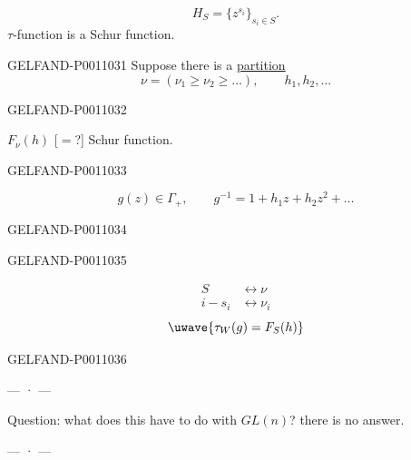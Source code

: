 \[
H_S=\{z^{s_i}\}_{s_i\in S}.
\]
$\tau$-function is a Schur function.


\begin{GelfandAdjacentEvidence}{GELFAND-P001103}{1}
Suppose there is a \underline{partition}
\[
\nu=(\nu_1\geq\nu_2\geq\ldots),\qquad h_1,h_2,\ldots
\]
\end{GelfandAdjacentEvidence}
\begin{GelfandAdjacentEvidence}{GELFAND-P001103}{2}

$F_\nu(h)$ [$=$?] Schur function.
\end{GelfandAdjacentEvidence}
\begin{GelfandAdjacentEvidence}{GELFAND-P001103}{3}


\[
g(z)\in\Gamma_+,\qquad g^{-1}=1+h_1z+h_2z^2+\ldots
\]
\end{GelfandAdjacentEvidence}
\begin{GelfandAdjacentEvidence}{GELFAND-P001103}{4}

\end{GelfandAdjacentEvidence}
\begin{GelfandAdjacentEvidence}{GELFAND-P001103}{5}

\[
\begin{aligned}
S&\leftrightarrow\nu\\
i-s_i&\leftrightarrow\nu_i
\end{aligned}
\]
\[
\text{\uwave{\(\tau_W(g)=F_S(h)\)}}
\]
\end{GelfandAdjacentEvidence}
\begin{GelfandAdjacentEvidence}{GELFAND-P001103}{6}


\begin{center}— · —\end{center}
Question: what does this have to do with $GL(n)$? there is no answer.
\begin{center}— · —\end{center}
\end{GelfandAdjacentEvidence}
